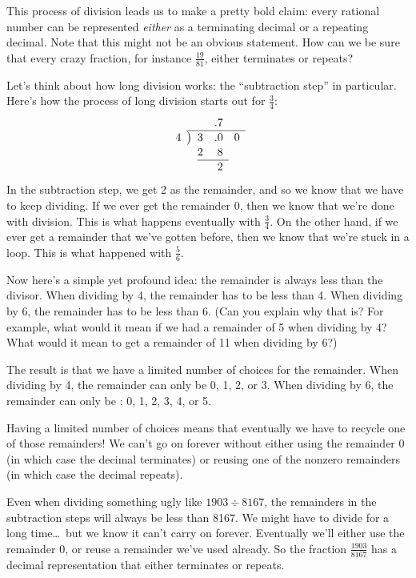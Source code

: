 
This process of division leads us to make a pretty bold claim: every rational number can be represented \textit{either} as a terminating decimal or a repeating decimal. Note that this might not be an obvious statement. How can we be sure that every crazy fraction, for instance $\frac{19}{81}$, either terminates or repeats?

Let's think about how long division works: the ``subtraction step'' in particular. Here's how the process of long division starts out for $\frac{3}{4}$:
\[
\renewcommand\arraystretch{1.1}
\begin{array}{*1r @{\hskip\arraycolsep}c@{\hskip\arraycolsep} *3r}
	&&			& .7	&	\\
\cline{2-5}
4	&\big)&	3	& .0	& 0 \\
	&&		2	&8		\\
\cline{3-4}
	&&			&2 & 	\\
\end{array}
\]
In the subtraction step, we get 2 as the remainder, and so we know that we have to keep dividing. If we ever get the remainder 0, then we know that we're done with division. This is what happens eventually with $\frac{3}{4}$. On the other hand, if we ever get a remainder that we've gotten before, then we know that we're stuck in a loop. This is what happened with $\frac{5}{6}$.

Now here's a simple yet profound idea: the remainder is always less than the divisor. When dividing by 4, the remainder has to be less than 4. When dividing by 6, the remainder has to be less than 6. (Can you explain why that is? For example, what would it mean if we had a remainder of 5 when dividing by 4? What would it mean to get a remainder of 11 when dividing by 6?)

The result is that we have a limited number of choices for the remainder. When dividing by 4, the remainder can only be 0, 1, 2, or 3. When dividing by 6, the remainder can only be : 0, 1, 2, 3, 4, or 5.

Having a limited number of choices means that eventually we have to recycle one of those remainders! We can't go on forever without either using the remainder 0 (in which case the decimal terminates) or reusing one of the nonzero remainders (in which case the decimal repeats).

Even when dividing something ugly like $1903 \div 8167$, the remainders in the subtraction steps will always be less than 8167. We might have to divide for a long time\ldots\ but we know it can't carry on forever. Eventually we'll either use the remainder 0, or reuse a remainder we've used already. So the fraction $\frac{1903}{8167}$ has a decimal representation that either terminates or repeats.

